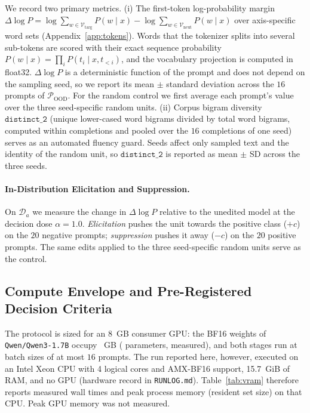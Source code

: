 \documentclass[11pt, a4paper]{article}
\begin{document}
We record two primary metrics. (i) The first-token log-probability margin $\Delta \log P = \log \sum_{w \in \mathcal{V}_{\mathrm{targ}}} P(w \mid x) - \log \sum_{w \in \mathcal{V}_{\mathrm{neut}}} P(w \mid x)$ over axis-specific word sets (Appendix~\ref{app:tokens}). Words that the tokenizer splits into several sub-tokens are scored with their exact sequence probability $P(w \mid x) = \prod_i P(t_i \mid x, t_{<i})$, and the vocabulary projection is computed in float32. $\Delta \log P$ is a deterministic function of the prompt and does not depend on the sampling seed, so we report its mean $\pm$ standard deviation across the $16$ prompts of $\mathcal{P}_{\mathrm{OOD}}$. For the random control we first average each prompt's value over the three seed-specific random units. (ii) Corpus bigram diversity $\texttt{distinct\_2}$ (unique lower-cased word bigrams divided by total word bigrams, computed within completions and pooled over the $16$ completions of one seed) serves as an automated fluency guard. Seeds affect only sampled text and the identity of the random unit, so $\texttt{distinct\_2}$ is reported as mean $\pm$ SD across the three seeds.

\paragraph{In-Distribution Elicitation and Suppression.} On $\mathcal{D}_a$ we measure the change in $\Delta \log P$ relative to the unedited model at the decision dose $\alpha = 1.0$. \emph{Elicitation} pushes the unit towards the positive class ($+c$) on the $20$ negative prompts; \emph{suppression} pushes it away ($-c$) on the $20$ positive prompts. The same edits applied to the three seed-specific random units serve as the control.

\subsection{Compute Envelope and Pre-Registered Decision Criteria}

The protocol is sized for an 8~GB consumer GPU: the BF16 weights of \texttt{Qwen/\allowbreak{}Qwen3-1.7B} occupy \WeightGB~GB (\NParams{} parameters, measured), and both stages run at batch sizes of at most $16$ prompts. The run reported here, however, executed on an Intel Xeon CPU with 4 logical cores and AMX-BF16 support, 15.7~GiB of RAM, and no GPU (hardware record in \texttt{RUNLOG.md}). Table~\ref{tab:vram} therefore reports measured wall times and peak process memory (resident set size) on that CPU. Peak GPU memory was not measured.
\end{document}
